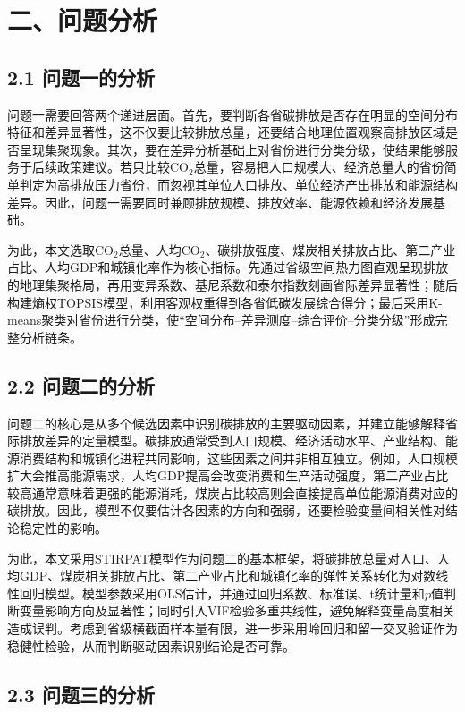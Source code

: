 \documentclass[UTF8,zihao=-4,fontset=windows]{ctexart}
\begin{document}
\section*{二、问题分析}

\subsection*{2.1 问题一的分析}

问题一需要回答两个递进层面。首先，要判断各省碳排放是否存在明显的空间分布特征和差异显著性，这不仅要比较排放总量，还要结合地理位置观察高排放区域是否呈现集聚现象。其次，要在差异分析基础上对省份进行分类分级，使结果能够服务于后续政策建议。若只比较CO$_2$总量，容易把人口规模大、经济总量大的省份简单判定为高排放压力省份，而忽视其单位人口排放、单位经济产出排放和能源结构差异。因此，问题一需要同时兼顾排放规模、排放效率、能源依赖和经济发展基础。

为此，本文选取CO$_2$总量、人均CO$_2$、碳排放强度、煤炭相关排放占比、第二产业占比、人均GDP和城镇化率作为核心指标。先通过省级空间热力图直观呈现排放的地理集聚格局，再用变异系数、基尼系数和泰尔指数刻画省际差异显著性；随后构建熵权TOPSIS模型，利用客观权重得到各省低碳发展综合得分；最后采用K-means聚类对省份进行分类，使“空间分布--差异测度--综合评价--分类分级”形成完整分析链条。

\subsection*{2.2 问题二的分析}

问题二的核心是从多个候选因素中识别碳排放的主要驱动因素，并建立能够解释省际排放差异的定量模型。碳排放通常受到人口规模、经济活动水平、产业结构、能源消费结构和城镇化进程共同影响，这些因素之间并非相互独立。例如，人口规模扩大会推高能源需求，人均GDP提高会改变消费和生产活动强度，第二产业占比较高通常意味着更强的能源消耗，煤炭占比较高则会直接提高单位能源消费对应的碳排放。因此，模型不仅要估计各因素的方向和强弱，还要检验变量间相关性对结论稳定性的影响。

为此，本文采用STIRPAT模型作为问题二的基本框架，将碳排放总量对人口、人均GDP、煤炭相关排放占比、第二产业占比和城镇化率的弹性关系转化为对数线性回归模型。模型参数采用OLS估计，并通过回归系数、标准误、t统计量和$p$值判断变量影响方向及显著性；同时引入VIF检验多重共线性，避免解释变量高度相关造成误判。考虑到省级横截面样本量有限，进一步采用岭回归和留一交叉验证作为稳健性检验，从而判断驱动因素识别结论是否可靠。

\subsection*{2.3 问题三的分析}
\end{document}
